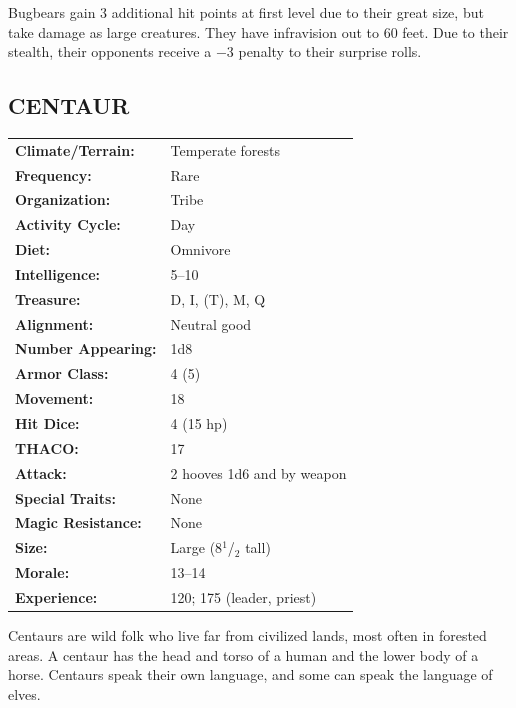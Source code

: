 \begin{multicols}{2}
Bugbears gain 3 additional hit points at first level due to their great size, but take damage as large creatures. They have infravision out to 60 feet. Due to their stealth, their opponents receive a $-3$ penalty to their surprise rolls.

\noindent \begin{minipage}{\columnwidth}

\vspace{1em}

\subsection{CENTAUR}

\noindent \begin{tabular}{p{}p{}}
\textbf{Climate/Terrain:}	& Temperate forests \\
\textbf{Frequency:} 		& Rare \\
\textbf{Organization:} 		& Tribe \\
\textbf{Activity Cycle:} 	& Day \\
\textbf{Diet:} 				& Omnivore \\
\textbf{Intelligence:} 		& 5--10 \\
\textbf{Treasure:} 			& D, I, (T), M, Q \\
\textbf{Alignment:} 		& Neutral good \\
\hline
\textbf{Number Appearing:} 	& 1d8 \\
\textbf{Armor Class:} 		& 4 (5) \\
\textbf{Movement:} 			& 18 \\
\textbf{Hit Dice:} 			& 4 (15 hp) \\
\textbf{THACO:} 			& 17 \\
\textbf{Attack:} 			& 2 hooves 1d6 and by weapon \\
\textbf{Special Traits:} & None \\
\textbf{Magic Resistance:} 	& None \\
\textbf{Size:} 				& Large (8$^1$/$_2$ tall) \\
\textbf{Morale:} 			& 13--14 \\
\textbf{Experience:} 		& 120; 175 (leader, priest) \\ %
\end{tabular}

\end{minipage}

Centaurs are wild folk who live far from civilized lands, most often in forested areas. A centaur has the head and torso of a human and the lower body of a horse. Centaurs speak their own language, and some can speak the language of elves.


\end{multicols}
